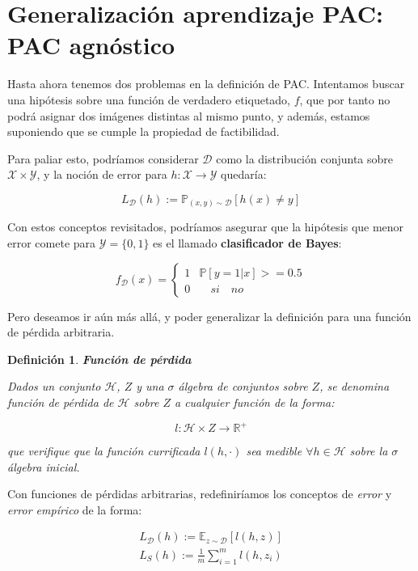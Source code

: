 \documentclass[11pt]{article}
\newtheorem{definition}{Definición}
\begin{document}
\section{Generalización aprendizaje PAC: PAC agnóstico}
\label{sec-3}
Hasta ahora tenemos dos problemas en la definición de PAC. Intentamos buscar una hipótesis sobre una función de verdadero etiquetado, $f$, que por tanto no podrá asignar dos imágenes distintas al mismo punto, y además, estamos suponiendo que se cumple la propiedad de factibilidad.

Para paliar esto, podríamos considerar $\mathcal{D}$ como la distribución conjunta sobre $\mathcal{X} \times \mathcal{Y}$, y la noción de error para $h: \mathcal{X} \rightarrow \mathcal{Y}$ quedaría:

\[L_{\mathcal{D}}(h):= \mathbb{P}_{(x,y) \sim \mathcal{D}} [h(x) \neq y]\]

Con estos conceptos revisitados, podríamos asegurar que la hipótesis que menor error comete para $\mathcal{Y} = \{0,1\}$ es el llamado \textbf{clasificador de Bayes}:

\[f_{\mathcal{D}}(x) = \left\{\begin{array}{ll}
1 & \mathbb{P} [y = 1 |x] >= 0.5\\
0 & \quad si \quad no
\end{array}\right.\]

Pero deseamos ir aún más allá, y poder generalizar la definición para una función de pérdida arbitraria.

\begin{definition}
\textbf{Función de pérdida}

Dados un conjunto $\mathcal{H}$, $Z$ y una $\sigma$ álgebra de conjuntos sobre $Z$, se denomina función de pérdida de $\mathcal{H}$ sobre $Z$ a cualquier función de la forma:

\[l : \mathcal{H} \times Z \rightarrow \mathbb{R}^{+}\]

que verifique que la función currificada $l(h, \cdot)$ sea medible $\forall h\in \mathcal{H}$ sobre la $\sigma$ álgebra inicial.
\end{definition}

Con funciones de pérdidas arbitrarias, redefiniríamos los conceptos de \emph{error} y \emph{error empírico} de la forma:

\begin{align*}
L_{\mathcal{D}} (h) := \mathbb{E}_{z\sim \mathcal{D}}[l(h,z)]\\
L_{S} (h) := \frac{1}{m} \sum_{i=1}^m l(h,z_i)
\end{align*}
\end{document}
